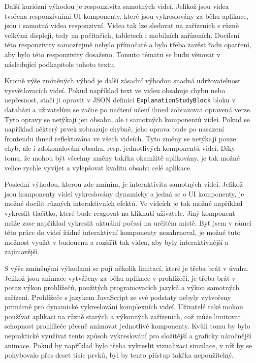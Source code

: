 Další kuriózní výhodou je responzivita samotných videí. Jelikož jsou videa tvořena responzivními UI komponenty, které jsou vykreslovány za běhu aplikace, jsou i samotná videa responzivní. Videa tak lze sledovat na zařízeních s různě velkými displeji, tedy na počítačích, tabletech i mobilních zařízeních. Docílení této responzivity samozřejmě nebylo přímočaré a bylo třeba zavést řadu opatření, aby bylo této responzivity dosaženo. Tomuto tématu se budu věnovat v následující podkapitole tohoto textu.

Kromě výše zmíněných výhod je další zásadní výhodou snadná udržovatelnost vysvětlovacích videí. Pokud například text ve videu obsahuje chybu nebo nepřesnost, stačí ji opravit v JSON definici \texttt{ExplanationStudyBlock} bloku v databázi a uživatelům se začne po načtení učení ihned zobrazovat opravená verze. Tyto opravy se netýkají jen obsahu, ale i samotných komponentů videí. Pokud se například některý prvek zobrazuje chybně, jeho oprava bude po nasazení frontendu ihned reflektována ve všech videích. Tyto změny se netýkají pouze chyb, ale i zdokonalování obsahu, resp. jednotlivých komponentů videí. Díky tomu, že mohou být všechny změny takřka okamžitě aplikovány, je tak možné velice rychle vyvíjet a vylepšovat kvalitu obsahu celé aplikace.

Poslední výhodou, kterou zde zmíním, je interaktivita samotných videí. Jelikož jsou komponenty videí vykreslovány dynamicky a jedná se o UI komponenty, je možné docílit různých interaktivních efektů. Ve videích je tak možné například vykreslit tlačítko, které bude reagovat na kliknutí uživatele. Jiný komponent může zase například vykreslit aktuální počasí na určitém místě. Byť jsem v rámci této práce do videí žádné interaktivní komponenty nezahrnoval, je možné tuto možnost využít v budoucnu a rozšířit tak videa, aby byly interaktivnější a zajímavější.


S výše zmíněnými výhodami se pojí několik limitací, které je třeba brát v úvahu. Jelikož jsou animace vytvářeny za běhu aplikace v prohlížeči, je třeba brát v potaz výkon prohlížečů, použitých programovacích jazyků a výkon samotných zařízení. Prohlížeče s jazykem JavaScript ze své podstaty nebyly vytvořeny primárně pro dynamické vykreslování komplexních videí. Uživatelé také mohou používat aplikaci na různě starých a výkonných zařízeních, což může limitovat schopnost prohlížeče přesně animovat jednotlivé komponenty. Kvůli tomu by bylo nepraktické využívat tento způsob vykreslování pro složitější a graficky náročnější animace. Pokud by například bylo třeba vykreslit vizualizaci simulace, v níž by se pohybovalo přes deset tisíc prvků, byl by tento přístup takřka nepoužitelný.

